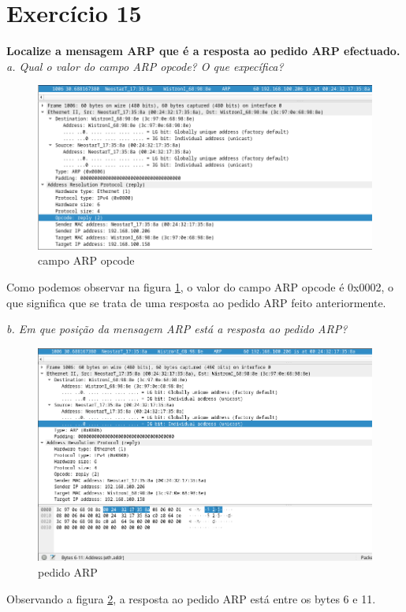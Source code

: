 \documentclass[a4paper]{report}
\begin{document}
\section{Exercício 15}
\textbf{Localize a mensagem ARP que é a resposta ao pedido ARP efectuado.}
\textit{a. Qual o valor do campo ARP opcode? O que expecífica?}
\begin{figure}[H]
    \centering 
    \includegraphics[width=\textwidth]{images/ex15a.png}
    \caption{campo ARP opcode}
    \label{fig:ex15a}
\end{figure}
Como podemos observar na figura \ref{fig:ex15a}, o valor do campo ARP opcode é
0x0002, o que significa que se trata de uma resposta ao pedido ARP feito
anteriormente.

\textit{b. Em que posição da mensagem ARP está a resposta ao pedido ARP?}

\begin{figure}[H]
    \centering 
    \includegraphics[width=\textwidth]{images/ex15b.png}
    \caption{pedido ARP}
    \label{fig:ex15b}
\end{figure}
Observando a figura \ref{fig:ex15b}, a resposta ao pedido ARP está entre os
bytes 6 e 11.
\end{document}
